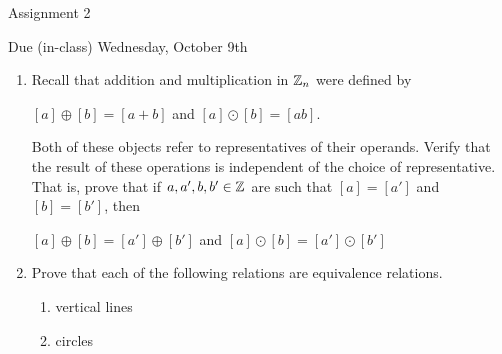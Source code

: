 \documentclass[11pt,fleqn,dvipsnames,usenames]{article}
\renewcommand{\headrulewidth}{1pt}
\newcommand{\p}{\noindent}
\begin{document}
\fancyhead[L]{\course}
\fancyhead[R]{\term}
\renewcommand{\headrulewidth}{0.4pt}

\begin{center}
{\huge Assignment 2}
\vsp

{\large Due (in-class) Wednesday, October 9th}
\end{center}

\begin{enumerate}
\item Recall that addition and multiplication in $\mathbb{Z}_n$ were defined by
\begin{center}
$[a] \oplus [b] = [a + b]$ and $[a]\odot [b] = [ab]$.
\end{center}
\p Both of these objects refer to representatives of their operands.  Verify that the result of these operations is independent of the choice of representative.  That is, prove that if $a,a',b,b'\in\mathbb{Z}$ are such that $[a] = [a']$ and $[b] = [b']$, then
\begin{center}
$[a]\oplus [b] = [a']\oplus [b']$ and $[a]\odot [b] = [a']\odot [b']$
\end{center}

\item Prove that each of the following relations are equivalence relations.
\begin{enumerate}
	\item vertical lines
	\item circles
\end{enumerate}
\end{enumerate}
\vsp
\end{document}
